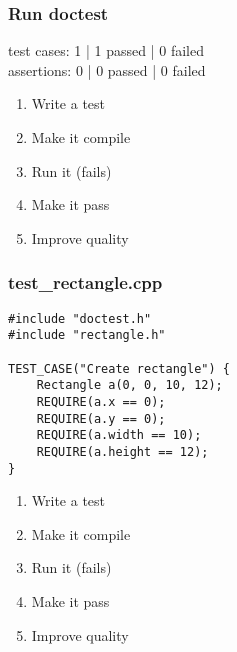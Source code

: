 \begin{frame}[fragile]
\frametitle{Run doctest}
\begin{minipage}[t]{0.48\linewidth}
test cases: 1 | 1 passed | 0 failed\\
assertions: 0 | 0 passed | 0 failed\\
\end{minipage}\hfill
\begin{minipage}[t]{0.28\linewidth}
  \small
  \begin{enumerate} 
    \item \textcolor{deadcolor}{Write a test}
    \item \textcolor{deadcolor}{Make it compile}
    \item \textcolor{activecolor}{Run it (fails)}
    \item \textcolor{deadcolor}{Make it pass}
    \item \textcolor{deadcolor}{Improve quality}
  \end{enumerate} 
\end{minipage}
\end{frame}


\begin{frame}[fragile]
\frametitle{test\_rectangle.cpp}
\begin{minipage}[t]{0.48\linewidth}
\begin{lstlisting}
#include "doctest.h"
#include "rectangle.h"

TEST_CASE("Create rectangle") {
    Rectangle a(0, 0, 10, 12);
    REQUIRE(a.x == 0);
    REQUIRE(a.y == 0);
    REQUIRE(a.width == 10);
    REQUIRE(a.height == 12);
}
\end{lstlisting}
\end{minipage}\hfill
\begin{minipage}[t]{0.28\linewidth}
  \small
  \begin{enumerate} 
    \item \textcolor{activecolor}{Write a test}
    \item \textcolor{deadcolor}{Make it compile}
    \item \textcolor{deadcolor}{Run it (fails)}
    \item \textcolor{deadcolor}{Make it pass}
    \item \textcolor{deadcolor}{Improve quality}
  \end{enumerate} 
\end{minipage}
\end{frame}


